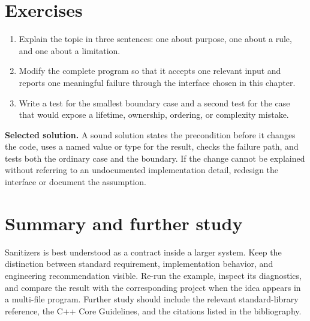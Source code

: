\section{Exercises}
\begin{enumerate}
  \item Explain the topic in three sentences: one about purpose, one about a rule, and one about a limitation.
  \item Modify the complete program so that it accepts one relevant input and reports one meaningful failure through the interface chosen in this chapter.
  \item Write a test for the smallest boundary case and a second test for the case that would expose a lifetime, ownership, ordering, or complexity mistake.
\end{enumerate}

\textbf{Selected solution.} A sound solution states the precondition before it changes the code, uses a named value or type for the result, checks the failure path, and tests both the ordinary case and the boundary. If the change cannot be explained without referring to an undocumented implementation detail, redesign the interface or document the assumption.

\section{Summary and further study}
Sanitizers is best understood as a contract inside a larger system. Keep the distinction between standard requirement, implementation behavior, and engineering recommendation visible. Re-run the example, inspect its diagnostics, and compare the result with the corresponding project when the idea appears in a multi-file program. Further study should include the relevant standard-library reference, the C++ Core Guidelines, and the citations listed in the bibliography.

